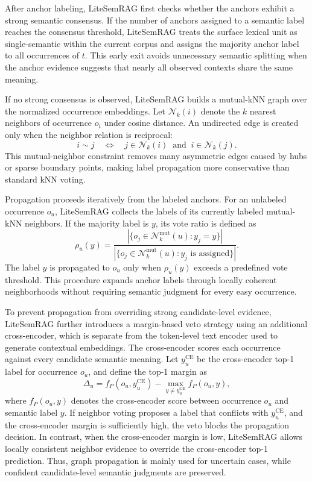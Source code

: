 \documentclass[conference]{IEEEtran}
\begin{document}
After anchor labeling, LiteSemRAG first checks whether the anchors exhibit a strong semantic consensus. If the number of anchors assigned to a semantic label reaches the consensus threshold, LiteSemRAG treats the surface lexical unit as single-semantic within the current corpus and assigns the majority anchor label to all occurrences of $t$. This early exit avoids unnecessary semantic splitting when the anchor evidence suggests that nearly all observed contexts share the same meaning.

If no strong consensus is observed, LiteSemRAG builds a mutual-kNN graph over the normalized occurrence embeddings. Let $\mathcal{N}_k(i)$ denote the $k$ nearest neighbors of occurrence $o_i$ under cosine distance. An undirected edge is created only when the neighbor relation is reciprocal:
\[
i \sim j \quad \Longleftrightarrow \quad
j \in \mathcal{N}_k(i) \;\; \text{and} \;\; i \in \mathcal{N}_k(j).
\]
This mutual-neighbor constraint removes many asymmetric edges caused by hubs or sparse boundary points, making label propagation more conservative than standard kNN voting.

Propagation proceeds iteratively from the labeled anchors. For an unlabeled occurrence $o_u$, LiteSemRAG collects the labels of its currently labeled mutual-kNN neighbors. If the majority label is $y$, its vote ratio is defined as
\[
\rho_u(y)=
\frac{|\{o_j \in \mathcal{N}^{\text{mut}}_k(u): y_j=y\}|}
{|\{o_j \in \mathcal{N}^{\text{mut}}_k(u): y_j \text{ is assigned}\}|}.
\]
The label $y$ is propagated to $o_u$ only when $\rho_u(y)$ exceeds a predefined vote threshold. This procedure expands anchor labels through locally coherent neighborhoods without requiring semantic judgment for every easy occurrence.

To prevent propagation from overriding strong candidate-level evidence, LiteSemRAG further introduces a margin-based veto strategy using an additional cross-encoder, which is separate from the token-level text encoder used to generate contextual embeddings. The cross-encoder scores each occurrence against every candidate semantic meaning. Let $y^{\text{CE}}_u$ be the cross-encoder top-1 label for occurrence $o_u$, and define the top-1 margin as
\[
\Delta_u =
f_P(o_u,y^{\text{CE}}_u)
-
\max_{y \neq y^{\text{CE}}_u} f_P(o_u,y),
\]
where $f_P(o_u,y)$ denotes the cross-encoder score between occurrence $o_u$ and semantic label $y$. If neighbor voting proposes a label that conflicts with $y^{\text{CE}}_u$, and the cross-encoder margin is sufficiently high, the veto blocks the propagation decision. In contrast, when the cross-encoder margin is low, LiteSemRAG allows locally consistent neighbor evidence to override the cross-encoder top-1 prediction. Thus, graph propagation is mainly used for uncertain cases, while confident candidate-level semantic judgments are preserved.
\end{document}
